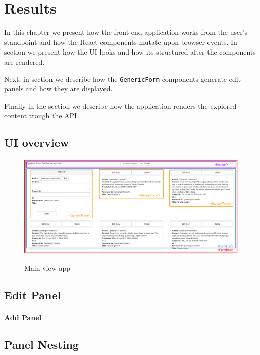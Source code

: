 \chapter{Results}
\label{chapter:results}

In this chapter we present how the front-end application works from the user's standpoint and how the React components mutate upon browser events. In section  we present how the UI looks and how its structured after the components are rendered.

Next, in section  we describe how the \texttt{GenericForm} components generate edit panels and how they are displayed.

Finally in the  section we describe how the application renders the explored content trough the API.

\section{UI overview}
\label{sec:ui-overview}



\begin{figure}	
	\includegraphics[scale=0.90]{src/img/screenshot-app-0.pdf}
	\label{img:main-view}
	\caption{Main view app}
\end{figure}


\section{Edit Panel}
\label{sec:edit-panel}



\subsubsection{Add Panel}
\label{sec:add	-panel}


\section{Panel Nesting}
\label{sec:panel-nesting}

